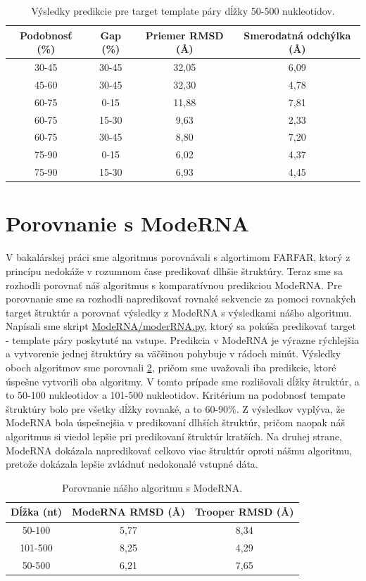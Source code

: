 \begin{table}[b!]
\centering
\begin{tabular}{cccc}
\toprule
Podobnosť (\%) & Gap (\%)  & Priemer RMSD (Å) & Smerodatná odchýlka  (Å)\\
\midrule
30-45  & 30-45 & 32,05 & 6,09 \\
45-60  & 30-45 & 32,30 & 4,78 \\
60-75  &   0-15 & 11,88 & 7,81 \\
60-75  & 15-30 &   9,63 & 2,33 \\
60-75  & 30-45 &   8,80 & 7,20 \\
75-90  &   0-15 &   6,02 & 4,37 \\
75-90  & 15-30 &   6,93 & 4,45 \\
\bottomrule
\end{tabular}
\caption{Výsledky predikcie pre target template páry dĺžky 50-500 nukleotidov. }\label{tab4.1}
\end{table}


\section{Porovnanie s ModeRNA}
V bakalárskej práci sme algoritmus porovnávali s algortimom FARFAR, ktorý z princípu nedokáže v rozumnom čase predikovať dlhšie štruktúry. Teraz sme sa rozhodli porovnať náš algoritmus s komparatívnou predikciou ModeRNA. Pre porovnanie sme sa rozhodli napredikovať rovnaké sekvencie za pomoci rovnakých target štruktúr a porovnať výsledky z ModeRNA s výsledkami nášho algoritmu. Napísali sme skript \url{ModeRNA/moderRNA.py}, ktorý sa pokúša predikovať target - template páry poskytuté na vstupe. Predikcia v ModeRNA je výrazne rýchlejšia a vytvorenie jednej štruktúry sa väčšinou pohybuje v rádoch minút. Výsledky oboch algoritmov sme porovnali \ref{tab4.2}, pričom sme uvažovali iba predikcie, ktoré úspešne vytvorili oba algoritmy. V tomto prípade sme rozlišovali dĺžky štruktúr, a to 50-100 nukleotidov a 101-500 nukleotidov. Kritérium na podobnosť tempate štruktúry bolo pre všetky dĺžky rovnaké, a to 60-90\%. Z výsledkov vyplýva, že ModeRNA bola úspešnejšia v predikovaní dlhších štruktúr, pričom naopak náš algoritmus si viedol lepšie pri predikovaní štruktúr kratších. Na druhej strane, ModeRNA dokázala napredikovať celkovo viac štruktúr oproti nášmu algoritmu, pretože dokázala lepšie zvládnuť nedokonalé vstupné dáta.

\begin{table}[b!]
\centering
\begin{tabular}{ccc}
\toprule
Dĺžka (nt) & ModeRNA RMSD (Å) & Trooper RMSD (Å) \\
\midrule
50-100    & 5,77 & 8,34  \\
101-500  & 8,25 & 4,29  \\
\bottomrule
50-500  & 6,21 & 7,65  \\
\end{tabular}
\caption{Porovnanie nášho algoritmu s ModeRNA. }\label{tab4.2}
\end{table}

